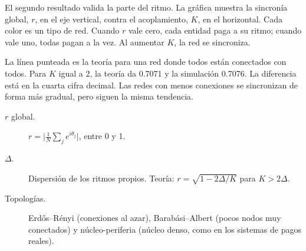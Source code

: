 \begin{decir}
El segundo resultado valida la parte del ritmo. La gráfica muestra la sincronía
global, $r$, en el eje vertical, contra el acoplamiento, $K$, en el horizontal. Cada
color es un tipo de red. Cuando $r$ vale
cero, cada entidad paga a su ritmo; cuando vale uno, todas pagan a la vez. Al aumentar
$K$, la red se sincroniza.

La línea punteada es la teoría para una red donde todos están conectados con todos. Para
$K$ igual a 2, la teoría da 0.7071 y la simulación 0.7076. La diferencia está en la
cuarta cifra decimal. Las redes con menos conexiones se sincronizan de forma más gradual,
pero siguen la misma tendencia.
\end{decir}
\begin{terminos}
\begin{description}
\item[$r$ global.] $r=\bigl|\frac1N\sum_je^{i\theta_j}\bigr|$, entre 0 y 1.
\item[$\Delta$.] Dispersión de los ritmos propios. Teoría: $r=\sqrt{1-2\Delta/K}$ para
$K>2\Delta$.
\item[Topologías.] Erdős–Rényi (conexiones al azar), Barabási–Albert (pocos nodos muy
conectados) y núcleo-periferia (núcleo denso, como en los sistemas de pagos reales).
\end{description}
\end{terminos}


